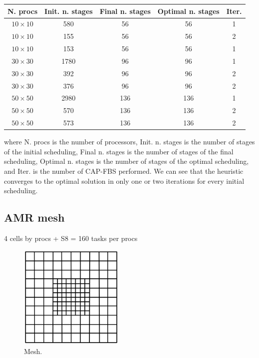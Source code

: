 \documentclass[letterpaper]{article}
\renewcommand{\(}{\left(}
\renewcommand{\)}{\right)}
\renewcommand{\[}{\left[}
\renewcommand{\]}{\right]}
\begin{document}
\begin{table}[H]
  \begin{center}
    \begin{tabular}{|c|c|c|c|c|}
      \hline
      N. procs & Init. n. stages & Final n. stages & Optimal n. stages & Iter. \\
      \hline
      $10\times 10$ &  580 &  56 &  56 & 1 \\
      $10\times 10$ &  155 &  56 &  56 & 2 \\
      $10\times 10$ &  153 &  56 &  56 & 1 \\
      $30\times 30$ & 1780 &  96 &  96 & 1 \\
      $30\times 30$ &  392 &  96 &  96 & 2 \\
      $30\times 30$ &  376 &  96 &  96 & 2 \\
      $50\times 50$ & 2980 & 136 & 136 & 1 \\
      $50\times 50$ &  570 & 136 & 136 & 2 \\ %
      $50\times 50$ &  573 & 136 & 136 & 2 \\
      \hline
    \end{tabular}
  \end{center}
\end{table}
where N. procs is the number of processors, Init. n. stages is the number of
stages of the initial scheduling, Final n. stages is the number of stages of the
final scheduling, Optimal n. stages is the number of stages of the optimal
scheduling, and Iter. is the number of CAP-FBS performed. We can see that the
heuristic converges to the optimal solution in only one or two iterations for
every initial scheduling.

\subsection{AMR mesh}
4 cells by procs + S8 = 160 tasks per procs

\begin{figure}[H]
  \centering
  \includegraphics[width=5cm]{mesh}
  \caption{Mesh.}
\end{figure}
\end{document}
